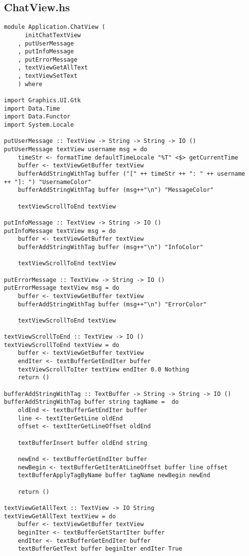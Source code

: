 \documentclass[russian,utf8,simple,emptystyle]{eskdtext}
\begin{document}
\subsection{ChatView.hs}
\begin{lstlisting}
module Application.ChatView (
      initChatTextView
    , putUserMessage
    , putInfoMessage
    , putErrorMessage
    , textViewGetAllText
    , textViewSetText
    ) where

import Graphics.UI.Gtk
import Data.Time 
import Data.Functor
import System.Locale 

putUserMessage :: TextView -> String -> String -> IO ()
putUserMessage textView username msg = do 
    timeStr <- formatTime defaultTimeLocale "%T" <$> getCurrentTime
    buffer <- textViewGetBuffer textView
    bufferAddStringWithTag buffer ("[" ++ timeStr ++ ": " ++ username ++ "]: ") "UsernameColor"
    bufferAddStringWithTag buffer (msg++"\n") "MessageColor"

    textViewScrollToEnd textView

putInfoMessage :: TextView -> String -> IO ()
putInfoMessage textView msg = do 
    buffer <- textViewGetBuffer textView
    bufferAddStringWithTag buffer (msg++"\n") "InfoColor"

    textViewScrollToEnd textView

putErrorMessage :: TextView -> String -> IO ()
putErrorMessage textView msg = do 
    buffer <- textViewGetBuffer textView
    bufferAddStringWithTag buffer (msg++"\n") "ErrorColor"

    textViewScrollToEnd textView

textViewScrollToEnd :: TextView -> IO ()
textViewScrollToEnd textView = do 
    buffer <- textViewGetBuffer textView
    endIter <- textBufferGetEndIter buffer
    textViewScrollToIter textView endIter 0.0 Nothing 
    return ()

bufferAddStringWithTag :: TextBuffer -> String -> String -> IO ()
bufferAddStringWithTag buffer string tagName =  do 
    oldEnd <- textBufferGetEndIter buffer
    line <- textIterGetLine oldEnd
    offset <- textIterGetLineOffset oldEnd

    textBufferInsert buffer oldEnd string

    newEnd <- textBufferGetEndIter buffer 
    newBegin <- textBufferGetIterAtLineOffset buffer line offset 
    textBufferApplyTagByName buffer tagName newBegin newEnd

    return ()

textViewGetAllText :: TextView -> IO String 
textViewGetAllText textView = do 
    buffer <- textViewGetBuffer textView 
    beginIter <- textBufferGetStartIter buffer 
    endIter <- textBufferGetEndIter buffer 
    textBufferGetText buffer beginIter endIter True


\end{lstlisting}
\end{document}
